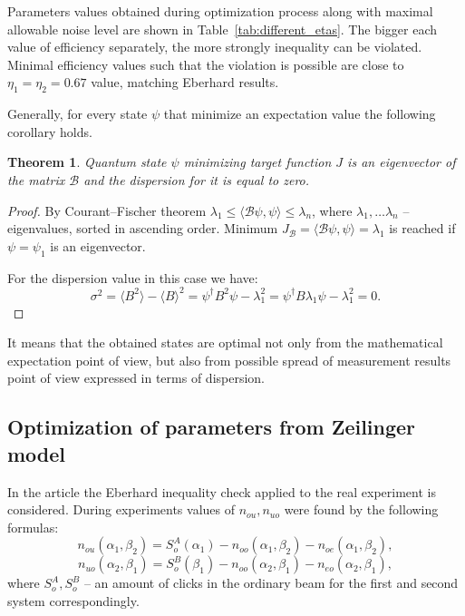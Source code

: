 \documentclass[%
master,         %
subf,           %
href,           %
colorlinks=true %
]{disser}
\numberwithin{equation}{section}
\numberwithin{figure}{section}
\newtheorem{theorem}{Theorem}[section]
\begin{document}
\endgroup

Parameters values obtained during optimization process along with maximal allowable noise level 
are shown in Table~\ref{tab:different_etas}. The bigger each value of efficiency separately, the more 
strongly inequality can be violated. Minimal efficiency values such that the violation is possible are close 
to  $\eta_1 = \eta_2 = 0.67$ value, matching Eberhard results.

Generally, for every state $\psi$ that minimize an expectation value the following corollary holds.

\begin{theorem}
Quantum state $\psi$ minimizing target function $J$ is an eigenvector of the matrix $\mathcal{B}$ and the dispersion for it is equal to zero.
\end{theorem}
\begin{proof}
By Courant–Fischer theorem $\lambda_1 \leq \langle\mathcal{B}\psi, \psi\rangle \leq \lambda_n$, where $\lambda_1, \ldots \lambda_n$ -- eigenvalues, sorted in ascending order. Minimum 
$J_\mathcal{B} = \langle\mathcal{B}\psi, \psi\rangle = \lambda_1$ is reached if $\psi = \psi_1$ is an 
eigenvector.

For the dispersion value in this case we have:
\[\sigma^2 = \langle B^2\rangle - \langle B\rangle^2 = \psi^\dagger B^2 \psi - \lambda_1^2 = \psi^\dagger B \lambda_1  \psi - \lambda_1^2 = 0.
\]
\end{proof}

It means that the obtained states are optimal not only from the mathematical expectation point of view, but also from 
possible spread of measurement results point of view expressed in terms of dispersion.

\clearpage

\subsection{Optimization of parameters from Zeilinger model}
In the article \cite{Zeilinger} the Eberhard inequality check applied to the real experiment is considered. 
During experiments values of $n_{ou}, n_{uo}$  were found by the following formulas:
\[
n_{ou}(\alpha_1, \beta_2) = S_o^A(\alpha_1) - n_{oo}(\alpha_1, \beta_2) - n_{oe}(\alpha_1, \beta_2),
\]
\[
n_{uo}(\alpha_2, \beta_1) = S_o^B(\beta_1) - n_{oo}(\alpha_2, \beta_1) - n_{eo}(\alpha_2, \beta_1),
\]
where $S_o^A, S_o^B$ -- an amount of clicks in the ordinary beam for the first and second system 
correspondingly.
\end{document}
